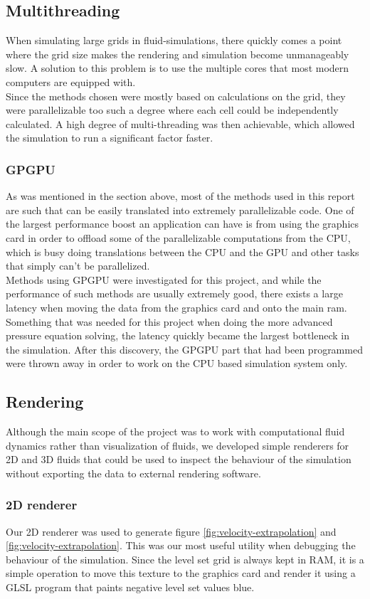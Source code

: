 \documentclass[twocolumn]{article}
\begin{document}
\subsection{Multithreading}
When simulating large grids in fluid-simulations, there quickly comes a point where the grid size makes the rendering and simulation become unmanageably slow. A solution to this problem is to use the multiple cores that most modern computers are equipped with. 
\\
Since the methods chosen were mostly based on calculations on the grid, they were parallelizable too such a degree where each cell could be independently calculated. A high degree of multi-threading was then achievable, which allowed the simulation to run a significant factor faster.
\subsubsection{GPGPU}
As was mentioned in the section above, most of the methods used in this report are such that can be easily translated into extremely parallelizable code. One of the largest performance boost an application can have is from using the graphics card in order to offload some of the parallelizable computations from the CPU, which is busy doing translations between the CPU and the GPU and other tasks that simply can't be parallelized.
\\
Methods using GPGPU were investigated for this project, and while the performance of such methods are usually extremely good, there exists a large latency when moving the data from the graphics card and onto the main ram. Something that was needed for this project when doing the more advanced pressure equation solving, the latency quickly became the largest bottleneck in the simulation. After this discovery, the GPGPU part that had been programmed were thrown away in order to work on the CPU based simulation system only.

\subsection{Rendering}
Although the main scope of the project was to work with computational fluid dynamics rather than visualization of fluids, we developed simple renderers for 2D and 3D fluids that could be used to inspect the behaviour of the simulation without exporting the data to external rendering software.

\subsubsection{2D renderer}
Our 2D renderer was used to generate figure \ref{fig:velocity-extrapolation} and  \ref{fig:velocity-extrapolation}. This was our most useful utility when debugging the behaviour of the simulation. Since the level set grid is always kept in RAM, it is a simple operation to move this texture to the graphics card and render it using a  GLSL program that paints negative level set values blue.
\end{document}

